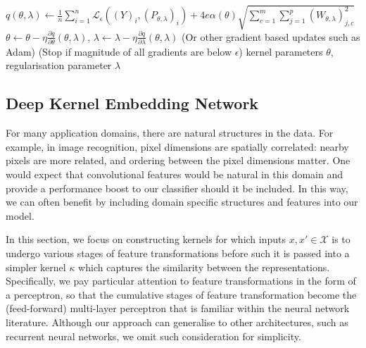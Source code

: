 \documentclass{article}
\begin{document}
\begin{algorithm}[tb]
\begin{algorithmic}[1]
				\STATE $q(\theta, \lambda) \leftarrow \frac{1}{n} \sum_{i = 1}^{n} \mathcal{L}_{\epsilon}((Y)_{i}, (P_{\theta, \lambda})_{i}) + 4 e \alpha(\theta) \sqrt{\sum_{c = 1}^{m} \sum_{j = 1}^{p} (W_{\theta, \lambda})_{j, c}^{2}}$
				\STATE $\theta \leftarrow \theta - \eta \frac{\partial q}{\partial \theta}(\theta, \lambda)$, $\lambda \leftarrow \lambda - \eta \frac{\partial q}{\partial \lambda}(\theta, \lambda)$ \hspace{\fill} (Or other gradient based updates such as Adam)
				 \hspace{\fill} (Stop if magnitude of all gradients are below $\epsilon$)
				 kernel parameters $\theta$, regularisation parameter $\lambda$
			\end{algorithmic}
		\end{algorithm}

	\subsection{Deep Kernel Embedding Network}
	\label{app:deep_kernel_embeddings}
	
		For many application domains, there are natural structures in the data. For example, in image recognition, pixel dimensions are spatially correlated: nearby pixels are more related, and ordering between the pixel dimensions matter. One would expect that convolutional features \citep{lecun1998gradient} would be natural in this domain and provide a performance boost to our classifier should it be included. In this way, we can often benefit by including domain specific structures and features into our model.

		In this section, we focus on constructing kernels for which inputs $x, x' \in \mathcal{X}$ is to undergo various stages of feature transformations before such it is passed into a simpler kernel $\kappa$ which captures the similarity between the representations. Specifically, we pay particular attention to feature transformations in the form of a perceptron, so that the cumulative stages of feature transformation become the (feed-forward) multi-layer perceptron that is familiar within the neural network literature. Although our approach can generalise to other architectures, such as recurrent neural networks, we omit such consideration for simplicity.
	
\end{document}
